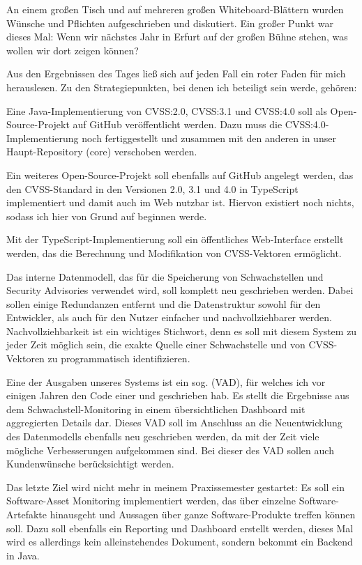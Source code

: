 An einem großen Tisch und auf mehreren großen Whiteboard-Blättern wurden Wünsche und Pflichten aufgeschrieben und diskutiert.
Ein großer Punkt war dieses Mal:
Wenn wir nächstes Jahr in Erfurt auf der großen Bühne stehen, was wollen wir dort zeigen können?

Aus den Ergebnissen des Tages ließ sich auf jeden Fall ein roter Faden für mich herauslesen.
Zu den Strategiepunkten, bei denen ich beteiligt sein werde, gehören:

\begin{smitemize}
    \item Eine Java-Implementierung von CVSS:2.0, CVSS:3.1 und CVSS:4.0 soll als Open-Source-Projekt auf GitHub veröffentlicht werden.
    Dazu muss die CVSS:4.0-Implementierung noch fertiggestellt und zusammen mit den anderen in unser Haupt-Repository (core) verschoben werden.
    \item Ein weiteres Open-Source-Projekt soll ebenfalls auf GitHub angelegt werden, das den CVSS-Standard in den Versionen 2.0, 3.1 und 4.0 in TypeScript implementiert und damit auch im Web nutzbar ist.
    Hiervon existiert noch nichts, sodass ich hier von Grund auf beginnen werde.
    \item Mit der TypeScript-Implementierung soll ein öffentliches Web-Interface erstellt werden, das die Berechnung und Modifikation von CVSS-Vektoren ermöglicht.
    \item Das interne Datenmodell, das für die Speicherung von Schwachstellen und Security Advisories verwendet wird, soll komplett neu geschrieben werden.
    Dabei sollen einige Redundanzen entfernt und die Datenstruktur sowohl für den Entwickler, als auch für den Nutzer einfacher und nachvollziehbarer werden.
    Nachvollziehbarkeit ist ein wichtiges Stichwort, denn es soll mit diesem System zu jeder Zeit möglich sein, die exakte Quelle einer Schwachstelle und von CVSS-Vektoren zu programmatisch identifizieren.
    \item Eine der Ausgaben unseres Systems ist ein sog.  (VAD), für welches ich vor einigen Jahren den Code einer  und  geschrieben hab.
    Es stellt die Ergebnisse aus dem Schwachstell-Monitoring in einem übersichtlichen Dashboard mit aggregierten Details dar.
    Dieses VAD soll im Anschluss an die Neuentwicklung des Datenmodells ebenfalls neu geschrieben werden, da mit der Zeit viele mögliche Verbesserungen aufgekommen sind.
    Bei dieser  des VAD sollen auch Kundenwünsche berücksichtigt werden.
    \item Das letzte Ziel wird nicht mehr in meinem Praxissemester gestartet:
    Es soll ein Software-Asset Monitoring implementiert werden, das über einzelne Software-Artefakte hinausgeht und Aussagen über ganze Software-Produkte treffen können soll.
    Dazu soll ebenfalls ein Reporting und Dashboard erstellt werden, dieses Mal wird es allerdings kein alleinstehendes Dokument, sondern bekommt ein Backend in Java.
\end{smitemize}

